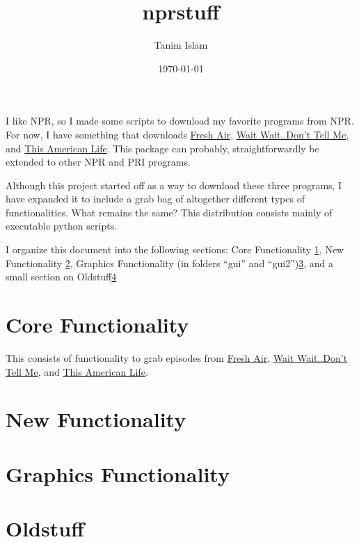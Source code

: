 \documentclass[]{article}
\title{nprstuff}
\date{\today}
\author{Tanim Islam}
\begin{document}
\maketitle

I like NPR, so I made some scripts to download my favorite programs from
NPR. For now, I have something that downloads
\href{http://www.npr.org/programs/fresh-air/}{Fresh Air},
\href{http://www.npr.org/programs/wait-wait-dont-tell-me/}{Wait
Wait..Don't Tell Me}, and \href{http://www.thisamericanlife.org/}{This
American Life}. This package can probably, straightforwardly be
extended to other NPR and PRI programs.

Although this project started off as a way to download these three
programs, I have expanded it to include a grab bag of altogether
different types of functionalities. What remains the same? This
distribution consists mainly of executable python scripts.

I organize this document into the following sections: Core
Functionality \ref{sec:core_functionality}, New Functionality
\ref{sec:new_functionality}, Graphics Functionality (in folders
``gui'' and ``gui2'')\ref{sec:graphics_functionality}, and a small
section on Oldstuff\ref{sec:oldstuff}

\section{Core Functionality} \label{sec:core_functionality}
This consists of functionality to grab episodes from
\href{http://www.npr.org/programs/fresh-air/}{Fresh Air}, 
\href{http://www.npr.org/programs/wait-wait-dont-tell-me/}{Wait
Wait..Don't Tell Me}, and \href{http://www.thisamericanlife.org/}{This
American Life}.

\section{New Functionality} \label{sec:new_functionality}

\section{Graphics Functionality} \label{sec:graphics_functionality}

\section{Oldstuff} \label{sec:oldstuff}
\end{document}
